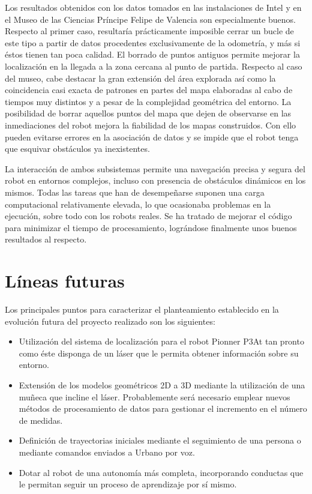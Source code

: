 \begin{itemize}
  Los resultados obtenidos con los datos tomados en las instalaciones de Intel y en el Museo de las Ciencias Príncipe Felipe de Valencia son especialmente buenos. Respecto al primer caso, resultaría prácticamente imposible cerrar un bucle de este tipo a partir de datos procedentes exclusivamente de la odometría, y más si éstos tienen tan poca calidad. El borrado de puntos antiguos permite mejorar la localización en la llegada a la zona cercana al punto de partida. Respecto al caso del museo, cabe destacar la gran extensión del área explorada así como la coincidencia casi exacta de patrones en partes del mapa elaboradas al cabo de tiempos muy distintos y a pesar de la complejidad geométrica del entorno. La posibilidad de borrar aquellos puntos del mapa que dejen de observarse en las inmediaciones del robot mejora la fiabilidad de los mapas construidos. Con ello pueden evitarse errores en la asociación de datos y se impide que el robot tenga que esquivar obstáculos ya inexistentes.

\end{itemize}

La interacción de ambos subsistemas permite una navegación precisa y segura del robot en entornos complejos, incluso con presencia de obstáculos dinámicos en los mismos. Todas las tareas que han de desempeñarse suponen una carga computacional relativamente elevada, lo que ocasionaba problemas en la ejecución, sobre todo con los robots reales. Se ha tratado de mejorar el código para minimizar el tiempo de procesamiento, lográndose finalmente unos buenos resultados al respecto.

\section{Líneas futuras}
Los principales puntos para caracterizar el planteamiento establecido en la evolución futura del proyecto realizado son los siguientes:

\begin{itemize}
  \item Utilización del sistema de localización para el robot Pionner P3At tan pronto como éste disponga de un láser que le permita obtener información sobre su entorno.
  \item Extensión de los modelos geométricos 2D a 3D mediante la utilización de una muñeca que incline el láser. Probablemente será necesario emplear nuevos métodos de procesamiento de datos para gestionar el incremento en
      el número de medidas.
  \item Definición de trayectorias iniciales mediante el seguimiento de una persona o mediante comandos enviados a Urbano por voz.
  \item Dotar al robot de una autonomía más completa, incorporando conductas que le permitan seguir un proceso de aprendizaje por sí mismo.
\end{itemize}


